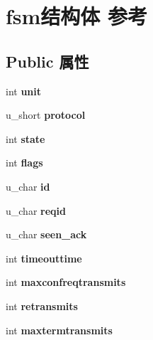 \hypertarget{structfsm}{}\section{fsm结构体 参考}
\label{structfsm}
\subsection*{Public 属性}
\begin{DoxyCompactItemize}
\item 
\mbox{\label{structfsm_afa4d847e2e861b044c8a4a4ce3a75167}} 
int {\bfseries unit}
\item 
\mbox{\label{structfsm_a63512b1c33bbd10795cc6d08ae95de7b}} 
u\+\_\+short {\bfseries protocol}
\item 
\mbox{\label{structfsm_aabf417357938f1177fed5e48ecbdea64}} 
int {\bfseries state}
\item 
\mbox{\label{structfsm_a943443dd3a63df1c209faf1bc4cf9fc7}} 
int {\bfseries flags}
\item 
\mbox{\label{structfsm_a21d8a3c859b000ef8b06592c502543dc}} 
u\+\_\+char {\bfseries id}
\item 
\mbox{\label{structfsm_a29a4471cbb340ca79d0814b34ed8d77d}} 
u\+\_\+char {\bfseries reqid}
\item 
\mbox{\label{structfsm_ac0c40d25cca0dcdbc02572e215c743c7}} 
u\+\_\+char {\bfseries seen\+\_\+ack}
\item 
\mbox{\label{structfsm_a9deef1589652e3789c51c746dd1bcb37}} 
int {\bfseries timeouttime}
\item 
\mbox{\label{structfsm_ae7303effc5a2f4a63be817ab998acfa2}} 
int {\bfseries maxconfreqtransmits}
\item 
\mbox{\label{structfsm_a7b744b3fa6780d5fa4f7f7f6895b20c9}} 
int {\bfseries retransmits}
\item 
\mbox{\label{structfsm_ab3cd5e2bf84d72a04cb78308d4a3de81}} 
int {\bfseries maxtermtransmits}

\end{DoxyCompactItemize}
